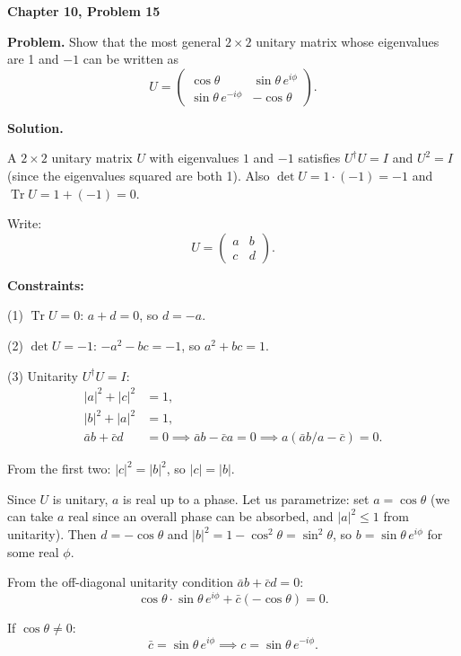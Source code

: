 \documentclass[12pt]{article}
\begin{document}
\begin{center}
{\Large\bfseries Chapter 10, Problem 15}
\end{center}

\noindent\textbf{Problem.} Show that the most general $2 \times 2$ unitary matrix whose eigenvalues are 1 and $-1$ can be written as
\[
U = \begin{pmatrix} \cos\theta & \sin\theta\, e^{i\phi} \\ \sin\theta\, e^{-i\phi} & -\cos\theta \end{pmatrix}.
\]

\bigskip
\noindent\textbf{Solution.}

A $2\times 2$ unitary matrix $U$ with eigenvalues $1$ and $-1$ satisfies $U^\dagger U = I$ and $U^2 = I$ (since the eigenvalues squared are both 1). Also $\det U = 1 \cdot (-1) = -1$ and $\operatorname{Tr} U = 1 + (-1) = 0$.

Write:
\[
U = \begin{pmatrix} a & b \\ c & d \end{pmatrix}.
\]

\noindent\textbf{Constraints:}

(1) $\operatorname{Tr} U = 0$: $a + d = 0$, so $d = -a$.

(2) $\det U = -1$: $-a^2 - bc = -1$, so $a^2 + bc = 1$.

(3) Unitarity $U^\dagger U = I$:
\begin{align*}
|a|^2 + |c|^2 &= 1, \\
|b|^2 + |a|^2 &= 1, \\
\bar{a}b + \bar{c}d &= 0 \implies \bar{a}b - \bar{c}a = 0 \implies a(\bar{a}b/a - \bar{c}) = 0.
\end{align*}

From the first two: $|c|^2 = |b|^2$, so $|c| = |b|$.

Since $U$ is unitary, $a$ is real up to a phase. Let us parametrize: set $a = \cos\theta$ (we can take $a$ real since an overall phase can be absorbed, and $|a|^2 \leq 1$ from unitarity). Then $d = -\cos\theta$ and $|b|^2 = 1 - \cos^2\theta = \sin^2\theta$, so $b = \sin\theta\, e^{i\phi}$ for some real $\phi$.

From the off-diagonal unitarity condition $\bar{a}b + \bar{c}d = 0$:
\[
\cos\theta \cdot \sin\theta\, e^{i\phi} + \bar{c}(-\cos\theta) = 0.
\]

If $\cos\theta \neq 0$:
\[
\bar{c} = \sin\theta\, e^{i\phi} \implies c = \sin\theta\, e^{-i\phi}.
\]
\end{document}
